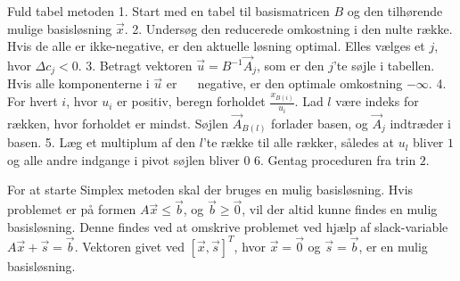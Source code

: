 \begin{pro} [label=pro:simplex,style=ingental] {Fuld tabel metoden}
1. Start med en tabel til basismatricen $B$ og den tilhørende mulige basisløsning $\vec{x}$.
2. Undersøg den reducerede omkostning i den nulte række. Hvis de alle er ikke-negative, er den aktuelle løsning optimal. Elles vælges et $j$, hvor $\Delta c_j <0$.
3. Betragt vektoren $\vec{u}=B^{-1}\vec{A}_j$, som er den $j$'te søjle i tabellen. Hvis alle komponenterne i $\vec{u}$ er $\quad$ negative, er den optimale omkostning $-\infty$.
4. For hvert $i$, hvor $u_i$ er positiv, beregn forholdet $\frac{x_{B(i)}}{u_i}$. Lad $l$ være indeks for rækken, hvor forholdet er mindst. Søjlen $\vec{A}_{B(l)}$ forlader basen, og $\vec{A}_j$ indtræder i basen. 
5. Læg et multiplum af den $l$'te række til alle rækker, således at $u_l$ bliver $1$ og alle andre indgange i pivot søjlen bliver $0$
6. Gentag proceduren fra trin $2$. 
\end{pro}
For at starte Simplex metoden skal der bruges en mulig basisløsning. Hvis problemet er på formen $A\vec{x} \leq \vec{b}$, og $\vec{b} \geq \vec{0}$, vil der altid kunne findes en mulig basisløsning. Denne findes ved at omskrive problemet ved hjælp af slack-variable $A\vec{x} +\vec{s}= \vec{b}$. Vektoren givet ved $[\vec{x},\vec{s}]^T$, hvor $\vec{x}=\vec{0}$ og $\vec{s}=\vec{b}$, er en mulig basisløsning. 
